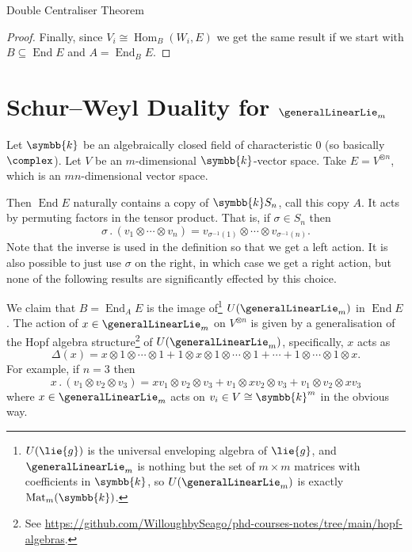 \documentclass[fleqn]{NotesClass}
\renewcommand{\field}{\symbb{k}}
\DeclareMathOperator{\End}{End}
\DeclareMathOperator{\Hom}{Hom}
\newcommand{\action}{\mathbin{.}}
\newcommand{\isomorphic}{\cong}
\DeclareMathOperator{\Mat}{Mat}
\begin{document}
\begin{thm}{Double Centraliser Theorem}{}
\begin{proof}
            Finally, since \(V_i \isomorphic \Hom_B(W_i, E)\) we get the same result if we start with \(B \subseteq \End E\) and \(A = \End_B E\).
        \end{proof}
    \end{thm}
    
    \section{Schur--Weyl Duality for \texorpdfstring{\(\generalLinearLie_m\)}{glm}}
    Let \(\field\) be an algebraically closed field of characteristic \(0\) (so basically \(\complex\)).
    Let \(V\) be an \(m\)-dimensional \(\field\)-vector space.
    Take \(E = V^{\otimes n}\), which is an \(mn\)-dimensional vector space.
    
    Then \(\End E\) naturally contains a copy of \(\field S_n\), call this copy \(A\).
    It acts by permuting factors in the tensor product.
    That is, if \(\sigma \in S_n\) then
    \begin{equation}
        \sigma \action (v_1 \otimes \dotsb \otimes v_n) = v_{\sigma^{-1}(1)} \otimes \dotsb \otimes v_{\sigma^{-1}(n)}.
    \end{equation}
    Note that the inverse is used in the definition so that we get a left action.
    It is also possible to just use \(\sigma\) on the right, in which case we get a right action, but none of the following results are significantly effected by this choice.
    
    We claim that \(B = \End_A E\) is the image of\footnote{\(U(\lie{g})\) is the universal enveloping algebra of \(\lie{g}\), and \(\generalLinearLie_m\) is nothing but the set of \(m \times m\) matrices with coefficients in \(\field\), so \(U(\generalLinearLie_m)\) is exactly \(\Mat_m(\field)\).} \(U(\generalLinearLie_m)\) in \(\End E\).
    The action of \(x \in \generalLinearLie_m\) on \(V^{\otimes n}\) is given by a generalisation of the Hopf algebra structure\footnote{See \url{https://github.com/WilloughbySeago/phd-courses-notes/tree/main/hopf-algebras}.} of \(U(\generalLinearLie_m)\), specifically, \(x\) acts as
    \begin{equation}
        \Delta(x) = x \otimes 1 \otimes \dotsb \otimes 1 + 1 \otimes x \otimes 1 \otimes \dotsb \otimes 1 + \dotsb + 1 \otimes \dotsb \otimes 1 \otimes x.
    \end{equation}
    For example, if \(n = 3\) then
    \begin{equation}
        x \action (v_1 \otimes v_2 \otimes v_3) = xv_1 \otimes v_2 \otimes v_3 + v_1 \otimes xv_2 \otimes v_3 + v_1 \otimes v_2 \otimes xv_3
    \end{equation}
    where \(x \in \generalLinearLie_m\) acts on \(v_i \in V \isomorphic \field^m\) in the obvious way.
    
\end{document}
